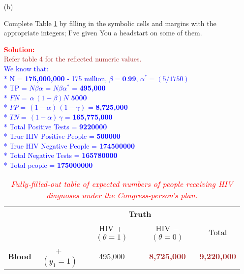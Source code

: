 \documentclass[12pt]{article}
\newcommand{\bi}[1]{\b{\i{#1}}}
\renewcommand{\b}[1]{\textbf{#1}}
\renewcommand{\i}[1]{\textit{#1}}
\begin{document}
\begin{itemize}
\begin{itemize}
\begin{itemize}
\item[(b)]

Complete Table \ref{t:congressperson-table} by filling in the symbolic cells and margins with the appropriate integers; I've given You a headstart on some of them. \fbox{\bi{[10 points]}}

\textcolor{red}{\textbf{Solution:}} \\
\textcolor{brown}{ Refer table 4 for the reflected numeric values.} \\

\textcolor{blue}{
We know that: \\
* N = \textbf{175,000,000} - 175 million, $\beta = \textbf{0.99}$, $\alpha^{*} = (5/1750)$ \\
* TP = $N\beta\alpha$ = $N\beta\alpha^{*}$ = \textbf{495,000} \\
* $FN \! = \, \alpha \, ( 1 - \beta )N$ \approx \textbf{5000} \\
* $FP \! = \, ( 1 - \alpha ) \, ( 1 - \gamma )$ = \textbf{8,725,000} \\
* $TN \! = \, ( 1 - \alpha ) \, \gamma$ = \textbf{165,775,000} \\
* Total Positive Tests = \textbf{9220000} \\ 
* True HIV Positive People = \textbf{500000} \\
* True HIV Negative People = \textbf{174500000} \\ 
* Total Negative Tests = \textbf{165780000} \\
* Total people = \textbf{175000000} \\
}


\begin{table}[t!]
\centering

\caption{\textit{\textcolor{red}{Fully-filled-out table of expected numbers of people receiving HIV diagnoses under the Congress-person's plan.}}}

\label{t:congressperson-table}

\bigskip

\begin{tabular}{cc|c|c|c}

& \multicolumn{1}{c}{} & \multicolumn{2}{c}{\textbf{Truth}} \\

& \multicolumn{1}{c}{} & \multicolumn{1}{c}{HIV \textcircled{+} $( \theta = 1 )$} & \multicolumn{1}{c}{HIV \textcircled{$-$} $( \theta = 0 )$}  & Total \\ \cline{3-4}

\textbf{Blood} & \textcircled{+} $( y_1 = 1 )$ & 495,000 & \textcolor{brown}{\textbf{8,725,000}} & \textcolor{brown}{\textbf{9,220,000}} \\ \cline{3-4}


\end{tabular}
\end{table}
\end{itemize}
\end{itemize}
\end{itemize}
\end{document}
